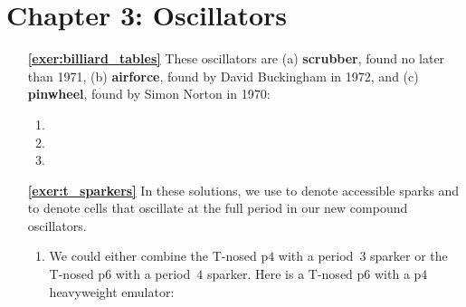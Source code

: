 \hypertarget{solutions_oscillators}{}\label{solutions_oscillators}
\section*{Chapter 3: Oscillators}
\renewcommand{\chapterfolder}{oscillators/}

\begin{multicols}{2}
	\begin{itemize}[leftmargin=0em]
		\item[\bf\color{ocre}\sffamily\ref{exer:billiard_tables}] These oscillators are (a) \textbf{scrubber}, found no later than 1971, (b) \textbf{airforce}, found by David Buckingham in 1972, and (c) \textbf{pinwheel}, found by Simon Norton in 1970: \\[-0.6em]
		\begin{enumerate}[leftmargin=1.5em,label=\bf\color{ocre}(\alph*)]
			\item {}
			
			\item {}
			
			\item {}
		\end{enumerate}
		
		
		\item[\bf\color{ocre}\sffamily\ref{exer:t_sparkers}] In these solutions, we use  to denote accessible sparks and  to denote cells that oscillate at the full period in our new compound oscillators.
		\begin{enumerate}[leftmargin=1.5em,label=\bf\color{ocre}(\alph*)]
			\item We could either combine the T-nosed p$4$ with a period~$3$ sparker or the T-nosed p$6$ with a period~$4$ sparker. Here is a T-nosed p$6$ with a p$4$ heavyweight emulator: \\[-0.6em]
			
			 \\[-0.8em]
			

\end{enumerate}
\end{itemize}
\end{multicols}
